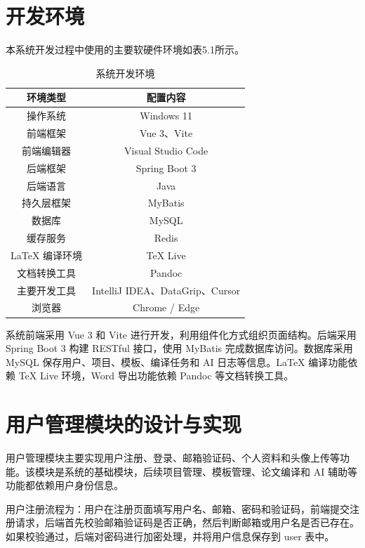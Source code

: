 \documentclass{xduugthesis}
\begin{document}
\section{开发环境}

本系统开发过程中使用的主要软硬件环境如表5.1所示。

\begin{table}[!ht]
    \centering
    \caption{系统开发环境}
    \label{tab:development-environment}
    \begin{tabular}{|c|c|}
        \hline
        \textbf{环境类型} & \textbf{配置内容} \\ \hline
        操作系统 & Windows 11 \\ \hline
        前端框架 & Vue 3、Vite \\ \hline
        前端编辑器 & Visual Studio Code \\ \hline
        后端框架 & Spring Boot 3 \\ \hline
        后端语言 & Java \\ \hline
        持久层框架 & MyBatis \\ \hline
        数据库 & MySQL \\ \hline
        缓存服务 & Redis \\ \hline
        \LaTeX{} 编译环境 & TeX Live \\ \hline
        文档转换工具 & Pandoc \\ \hline
        主要开发工具 & IntelliJ IDEA、DataGrip、Cursor \\ \hline
        浏览器 & Chrome / Edge \\ \hline
    \end{tabular}
\end{table}

系统前端采用 Vue 3 和 Vite 进行开发，利用组件化方式组织页面结构。后端采用 Spring Boot 3 构建 RESTful 接口，使用 MyBatis 完成数据库访问。数据库采用 MySQL 保存用户、项目、模板、编译任务和 AI 日志等信息。LaTeX 编译功能依赖 TeX Live 环境，Word 导出功能依赖 Pandoc 等文档转换工具。

\section{用户管理模块的设计与实现}
用户管理模块主要实现用户注册、登录、邮箱验证码、个人资料和头像上传等功能。该模块是系统的基础模块，后续项目管理、模板管理、论文编译和 AI 辅助等功能都依赖用户身份信息。

用户注册流程为：用户在注册页面填写用户名、邮箱、密码和验证码，前端提交注册请求，后端首先校验邮箱验证码是否正确，然后判断邮箱或用户名是否已存在。如果校验通过，后端对密码进行加密处理，并将用户信息保存到 user 表中。
\end{document}
